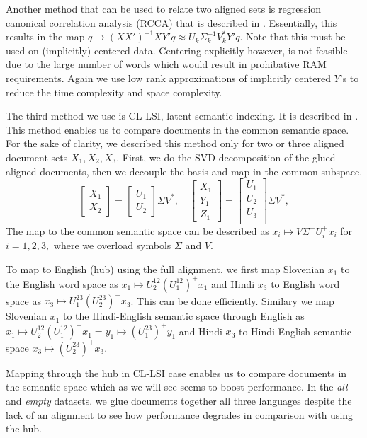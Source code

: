 \documentclass[twocolumn, draft]{article}
\begin{document}
Another method that can be used to relate two aligned sets is
regression canonical correlation analysis (RCCA) that is
described in \cite{ccar}.  Essentially, this results
in the map $q \mapsto (XX')^{-1} X Y' q \approx U_k \Sigma_k^{-1}
V_k^* Y' q$. Note that this must be used on (implicitly) centered
data. Centering explicitly however, is not feasible due to the
large number of words which would result in prohibative RAM
requirements.  Again we use low rank approximations of implicitly
centered $Y$'s to reduce the time complexity and space
complexity.

The third method we use is CL-LSI, latent semantic indexing. It
is described in \cite{cl-lsi}.  This method enables us to compare
documents in the common semantic space.  For the sake of clarity,
we described this method only for two or three aligned document
sets $X_1, X_2, X_3.$ First, we do the SVD decomposition of the
glued aligned documents, then we decouple the basis and map in
the common subspace.
\[
\begin{bmatrix}
X_1\\
X_2
\end{bmatrix} =
\begin{bmatrix}
U_1\\
U_2
\end{bmatrix} \Sigma V^*, \quad
\begin{bmatrix}
X_1\\
Y_1\\
Z_1
\end{bmatrix} =
\begin{bmatrix}
U_1\\
U_2\\
U_3\\
\end{bmatrix} \Sigma V^*,
\]
The map to the common semantic space can be described as $x_i
\mapsto V \Sigma^+ U_i^+ x_i$ for $i=1, 2, 3,$ where we overload
symbols $\Sigma$ and $V$.

To map to English (hub) using the full alignment, we first map
Slovenian $x_1$ to the English word space as $x_1 \mapsto
U^{12}_2 (U^{12}_1)^+ x_1$ and Hindi $x_3$ to English word space
as $x_3 \mapsto U^{23}_1 (U^{23}_2)^+ x_3$. This can be done
efficiently.  Similary we map Slovenian $x_1$ to the
Hindi-English semantic space through English as $x_1 \mapsto
U^{12}_2 (U^{12}_1)^+ x_1 = y_1 \mapsto (U^{23}_1)^+ y_1$ and
Hindi $x_3$ to Hindi-English semantic space $x_3 \mapsto
(U^{23}_2)^+ x_3.$

Mapping through the hub in CL-LSI case enables us to compare
documents in the semantic space which as we will see seems to
boost performance.  In the \emph{all} and
\emph{empty} datasets. we glue documents together all three
languages despite the lack of an alignment to see how performance
degrades in comparison with using the hub.
\end{document}
